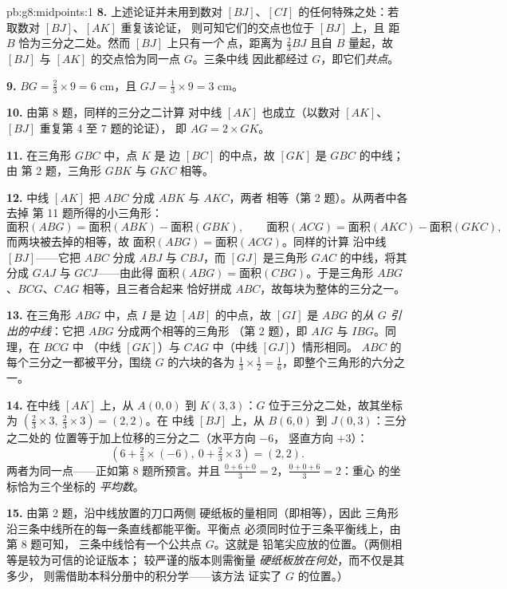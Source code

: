 \begin{solution}{pb:g8:midpoints:1}
\textbf{8.} 上述论证并未用到数对
$[BJ]$、$[CI]$ 的任何特殊之处：若取数对 $[BJ]$、$[AK]$ 重复该论证，
则可知它们的交点也位于 $[BJ]$ 上，且
距 $B$ 恰为三分之二处。然而 $[BJ]$ 上只有\emph{一个}
点，距离为 $\frac23 BJ$ 且自 $B$ 量起，故
$[BJ]$ 与 $[AK]$ 的交点恰为同一点 $G$。三条中线
因此都经过 $G$，即它们\emph{共点}。

\textbf{9.} $BG = \frac23 \times 9 = 6$ cm，且
$GJ = \frac13 \times 9 = 3$ cm。

\textbf{10.} 由第 8 题，同样的三分之二计算
对中线 $[AK]$ 也成立（以数对 $[AK]$、$[BJ]$ 重复第 4 至 7 题的论证），
即 $AG = 2 \times GK$。

\textbf{11.} 在三角形 $GBC$ 中，点 $K$ 是
边 $[BC]$ 的中点，故 $[GK]$ 是 $GBC$ 的中线；由
第 2 题，三角形 $GBK$ 与 $GKC$ 相等。

\textbf{12.} 中线 $[AK]$ 把 $ABC$ 分成 $ABK$ 与 $AKC$，两者
相等（第 2 题）。从两者中各去掉
第 11 题所得的小三角形：
\[
\text{面积}(ABG) = \text{面积}(ABK) - \text{面积}(GBK),
\qquad
\text{面积}(ACG) = \text{面积}(AKC) - \text{面积}(GKC),
\]
而两块被去掉的相等，故
$\text{面积}(ABG) = \text{面积}(ACG)$。同样的计算
沿中线 $[BJ]$——它把 $ABC$ 分成 $ABJ$ 与
$CBJ$，而 $[GJ]$ 是三角形 $GAC$ 的中线，将其分成
$GAJ$ 与 $GCJ$——由此得
$\text{面积}(ABG) = \text{面积}(CBG)$。于是三角形
$ABG$、$BCG$、$CAG$ 相等，且三者合起来
恰好拼成 $ABC$，故每块为整体的三分之一。

\textbf{13.} 在三角形 $ABG$ 中，点 $I$ 是
边 $[AB]$ 的中点，故 $[GI]$ 是 $ABG$ 的\emph{从
$G$ 引出的中线}：它把 $ABG$ 分成两个相等的三角形
（第 2 题），即 $AIG$ 与 $IBG$。同理，在 $BCG$ 中
（中线 $[GK]$）与 $CAG$ 中（中线 $[GJ]$）情形相同。
$ABC$ 的每个三分之一都被平分，围绕 $G$ 的六块的各为
$\frac13 \times \frac12 = \frac16$，即整个三角形的六分之一。

\textbf{14.} 在中线 $[AK]$ 上，从 $A(0,0)$ 到 $K(3,3)$：$G$
位于三分之二处，故其坐标为
$\left(\frac23 \times 3,\ \frac23 \times 3\right) = (2, 2)$。在
中线 $[BJ]$ 上，从 $B(6, 0)$ 到 $J(0, 3)$：三分之二处的
位置等于加上位移的三分之二（水平方向 $-6$，
竖直方向 $+3$）：
\[
\left(6 + \tfrac23 \times (-6),\ 0 + \tfrac23 \times 3\right)
= (2, 2) .
\]
两者为同一点——正如第 8 题所预言。并且
$\frac{0 + 6 + 0}{3} = 2$，$\frac{0 + 0 + 6}{3} = 2$：重心
的坐标恰为三个坐标的
\emph{平均数}。

\textbf{15.} 由第 2 题，沿中线放置的刀口两侧
硬纸板的量相同（即相等），因此
三角形沿三条中线所在的每一条直线都能平衡。平衡点
必须同时位于三条平衡线上，由第 8 题可知，
三条中线恰有一个公共点 $G$。这就是
铅笔尖应放的位置。（两侧相等是较为可信的论证版本；
较严谨的版本则需衡量
\emph{硬纸板放在何处}，而不仅是其多少，
则需借助本科分册中的积分学——该方法
证实了 $G$ 的位置。）
\end{solution}
